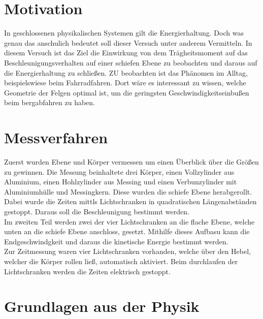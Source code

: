 \section{Motivation}
In geschlossenen physikalischen Systemen gilt die Energierhaltung. Doch was genau das anschulich bedeutet
soll dieser Versuch unter anderem Vermitteln. In diesem Versuch ist das Ziel die Einwirkung von dem Trägheitsmoment
auf das Beschleunigungsverhalten auf einer schiefen Ebene zu beobachten und daraus auf die Energierhaltung zu schließen.
ZU beobachten ist das Phänomen im Alltag, beispielswiese beim Fahrradfahren. Dort wäre es interessant zu wissen, welche Geometrie der Felgen optimal ist,
um die geringsten Geschwindigkeitseinbußen beim bergabfahren zu haben.


\section{Messverfahren}
Zuerst wurden Ebene und Körper vermessen um einen Überblick über die Größen zu gewinnen.
Die Messung beinhaltete drei Körper, einen Vollzylinder aus Aluminium, einen Hohlzylinder aus Messing und einen Verbunzylinder mit Aluminiumhülle und Messingkern.
Diese wurden die schiefe Ebene herabgerollt. Dabei wurde die Zeiten mittls Lichtschranken in quadratischen Längenabständen gestoppt.
Daraus soll die Beschleunigung bestimmt werden. \\
Im zweiten Teil werden zwei der vier Lichtschranken an die flache Ebene, welche unten an die schiefe Ebene anschloss, gesetzt.
Mithilfe dieses Aufbasu kann die Endgeschwindgkeit und daraus die kinetische Energie bestimmt werden.\\
Zur Zeitmessung waren vier Lichtschranken vorhanden, welche über den Hebel, welcher die Körper rollen ließ, automatisch aktiviert.
Beim durchlaufen der Lichtschranken werden die Zeiten elektrisch gestoppt.

\section{Grundlagen aus der Physik}

